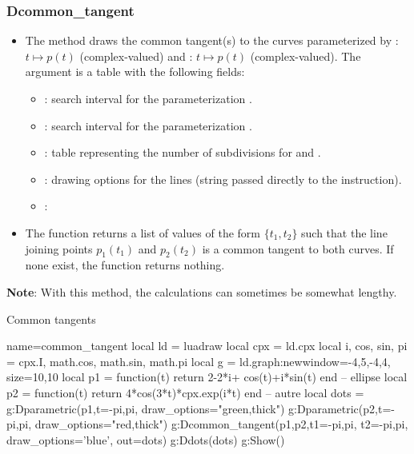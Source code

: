 \subsubsection{Dcommon\_tangent}
\begin{itemize}
    \item The method  draws the common tangent(s) to the curves parameterized by : \(t \mapsto p(t)\) (complex-valued) and : \(t \mapsto p(t)\) (complex-valued). The  argument is a table with the following fields:
    \begin{itemize}
        \item {} : search interval for the parameterization . 
        \item {} : search interval for the parameterization . 
        \item {} : table representing the number of subdivisions for  and . 
        \item {} : drawing options for the lines (string passed directly to the \drawcmd instruction). 
        \item {} : \arguScale
    \end{itemize}

    \item The function  returns a list of values ​​of the form $\{t_1,t_2\}$ such that the line joining points $p_1(t_1)$ and $p_2(t_2)$ is a common tangent to both curves. If none exist, the function returns nothing.
\end{itemize}
\textbf{Note}: With this method, the calculations can sometimes be somewhat lengthy.

\begin{demo}{Common tangents}
\begin{luadraw}{name=common_tangent}
local ld = luadraw
local cpx = ld.cpx
local i, cos, sin, pi = cpx.I, math.cos, math.sin, math.pi
local g = ld.graph:new{window={-4,5,-4,4}, size={10,10}}
local p1 = function(t) return  2-2*i+ cos(t)+i*sin(t) end -- ellipse
local p2 = function(t) return 4*cos(3*t)*cpx.exp(i*t) end -- autre
local dots = {}
g:Dparametric(p1,{t={-pi,pi}, draw_options="green,thick"})
g:Dparametric(p2,{t={-pi,pi}, draw_options="red,thick"})
g:Dcommon_tangent(p1,p2,{t1={-pi,pi}, t2={-pi,pi}, draw_options='blue', out=dots})
g:Ddots(dots)
g:Show()
\end{luadraw}
\end{demo}

